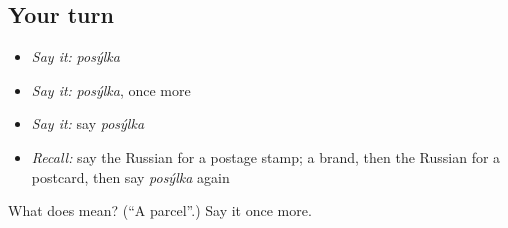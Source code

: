 \subsection*{Your turn}
\begin{itemize}
\raggedright
  \item \emph{Say it:} \emph{posýlka}
  \item \emph{Say it:} \emph{posýlka}, once more
  \item \emph{Say it:} say \emph{posýlka}
  \item \emph{Recall:} say the Russian for a postage stamp; a brand, then the Russian for a postcard, then say \emph{posýlka} again
\end{itemize}

\begin{tcolorbox}[breakable,colback=teal!4,colframe=teal!35!black,title={Before you move on}]
What does  mean? (\textquotedblleft{}A parcel\textquotedblright{}.) Say it once more.
\end{tcolorbox}
